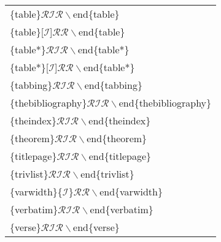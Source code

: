 \begin{longtable}{p{100mm}}
\{table\}$\mathcal{RIR}\backslash$end\{table\}\\
\{table\}[$\mathcal{I}$]$\mathcal{RR}\backslash$end\{table\}\\
\{table*\}$\mathcal{RIR}\backslash$end\{table*\}\\
\{table*\}[$\mathcal{I}$]$\mathcal{RR}\backslash$end\{table*\}\\
\{tabbing\}$\mathcal{RIR}\backslash$end\{tabbing\}\\
\{thebibliography\}$\mathcal{RIR}\backslash$end\{thebibliography\}\\
\{theindex\}$\mathcal{RIR}\backslash$end\{theindex\}\\
\{theorem\}$\mathcal{RIR}\backslash$end\{theorem\}\\
\{titlepage\}$\mathcal{RIR}\backslash$end\{titlepage\}\\
\{trivlist\}$\mathcal{RIR}\backslash$end\{trivlist\}\\
\{varwidth\}\{$\mathcal{I}$\}$\mathcal{RR}\backslash$end\{varwidth\}\\
\{verbatim\}$\mathcal{RIR}\backslash$end\{verbatim\}\\
\{verse\}$\mathcal{RIR}\backslash$end\{verse\}\\
\end{longtable}
\rmfamily